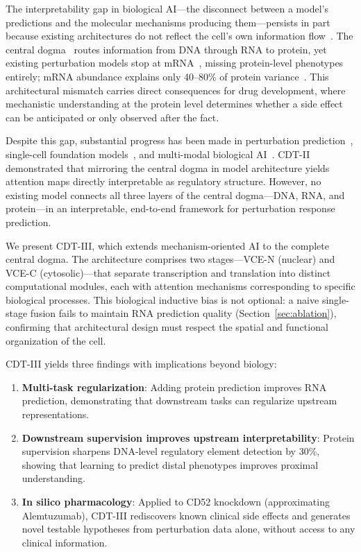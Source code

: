 \documentclass{article}
\begin{document}
The interpretability gap in biological AI---the disconnect between a model's predictions and the molecular mechanisms producing them---persists in part because existing architectures do not reflect the cell's own information flow~\citep{novakovsky2023,eraslan2019}. The central dogma~\citep{crick1970} routes information from DNA through RNA to protein, yet existing perturbation models stop at mRNA~\citep{roohani2024gears,lotfollahi2023cpa}, missing protein-level phenotypes entirely; mRNA abundance explains only 40--80\% of protein variance~\citep{gygi1999,vogel2012}. This architectural mismatch carries direct consequences for drug development, where mechanistic understanding at the protein level determines whether a side effect can be anticipated or only observed after the fact.

Despite this gap, substantial progress has been made in perturbation prediction~\citep{roohani2024gears,lotfollahi2023cpa}, single-cell foundation models~\citep{cui2024scgpt,theodoris2023}, and multi-modal biological AI~\citep{chen2024isoformer}. CDT-II~\citep{ota2026cdtii} demonstrated that mirroring the central dogma in model architecture yields attention maps directly interpretable as regulatory structure. However, no existing model connects all three layers of the central dogma---DNA, RNA, and protein---in an interpretable, end-to-end framework for perturbation response prediction.

We present CDT-III, which extends mechanism-oriented AI to the complete central dogma. The architecture comprises two stages---VCE-N (nuclear) and VCE-C (cytosolic)---that separate transcription and translation into distinct computational modules, each with attention mechanisms corresponding to specific biological processes. This biological inductive bias is not optional: a naive single-stage fusion fails to maintain RNA prediction quality (Section~\ref{sec:ablation}), confirming that architectural design must respect the spatial and functional organization of the cell.

CDT-III yields three findings with implications beyond biology:

\begin{enumerate}
    \item \textbf{Multi-task regularization}: Adding protein prediction improves RNA prediction, demonstrating that downstream tasks can regularize upstream representations.
    \item \textbf{Downstream supervision improves upstream interpretability}: Protein supervision sharpens DNA-level regulatory element detection by 30\%, showing that learning to predict distal phenotypes improves proximal understanding.
    \item \textbf{In silico pharmacology}: Applied to CD52 knockdown (approximating Alemtuzumab), CDT-III rediscovers known clinical side effects and generates novel testable hypotheses from perturbation data alone, without access to any clinical information.
\end{enumerate}
\end{document}
